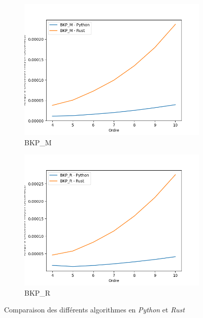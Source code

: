 \documentclass[12pt,a4paper]{article}
\begin{document}
\begin{figure}[ht]
\begin{subfigure}[b]{0.45\textwidth}
    \includegraphics[width=\textwidth]{images/total_pyrust_BKP_M_plot.png}
  \caption{BKP\_M}%
  \label{subfig:pr_bkp_m}
  \end{subfigure}
  \begin{subfigure}[b]{0.45\textwidth}
    \includegraphics[width=\textwidth]{images/total_pyrust_BKP_R_plot.png}
  \caption{BKP\_R}%
  \label{subfig:pr_bkp_r}
  \end{subfigure}
  \caption{Comparaison des différents algorithmes en \emph{Python} et \emph{Rust}}%
  \label{fig:pvr}
\end{figure}
\end{document}
